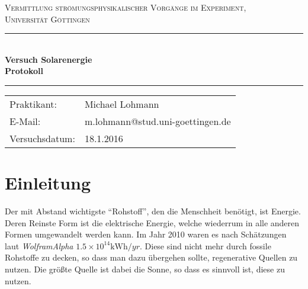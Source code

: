 \documentclass[12pt,a4paper,titlepage,headinclude,bibtotoc]{scrartcl}
\begin{document}
\begin{titlepage}
\centering
\textsc{\Large Vermittlung strömungsphysikalischer Vorgänge im Experiment,
\\[1.5ex] Universität Göttingen}

\vspace*{3cm}

\rule{\textwidth}{1pt}\\[0.5cm]
{\huge \bfseries
  Versuch Solarenergie  \\[1.5ex]
  Protokoll}\\[0.5cm]
\rule{\textwidth}{1pt}

\vspace*{3cm}

\begin{Large}
\begin{tabular}{ll}
Praktikant: &  Michael Lohmann\\
 E-Mail: & m.lohmann@stud.uni-goettingen.de\\
 Versuchsdatum: & 18.1.2016\\
\end{tabular}
\end{Large}

\vspace*{0.8cm}

\begin{Large}
\end{Large}

\end{titlepage}

\tableofcontents

\newpage

\section{Einleitung}
Der mit Abstand wichtigste "`Rohstoff"', den die Menschheit benötigt, ist Energie.
Deren Reinste Form ist die elektrische Energie, welche wiederrum in alle anderen Formen umgewandelt werden kann.
Im Jahr 2010 waren es nach Schätzungen laut \textit{WolframAlpha} $1.5\times10^{14}\si{\kilo\watt\hour\per yr}$.
Diese sind nicht mehr durch fossile Rohstoffe zu decken, so dass man dazu übergehen sollte, regenerative Quellen zu nutzen.
Die größte Quelle ist dabei die Sonne, so dass es sinnvoll ist, diese zu nutzen.
\end{document}
